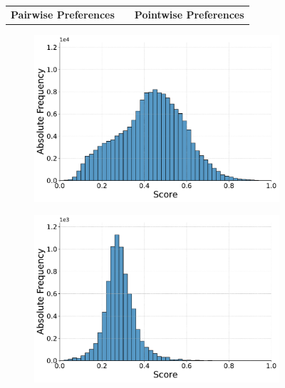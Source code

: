 \begin{figure}[t!]
    \centering
    \begin{tabular}{ccc}
        \textbf{Pairwise Preferences} & \hspace{2cm} & \textbf{Pointwise Preferences} \\
    \end{tabular}
    \footnotesize
    \begin{subfigure}[b]{0.49\textwidth}
        \centering
        \includegraphics[width=\textwidth]{graphics/seaborn/pairwise_cw22_score_distribution_flan-t5-base.pdf}
        \label{fig:pairwise_flan-t5-base}
    \end{subfigure}
    \hfill
    \begin{subfigure}[b]{0.49\textwidth}
        \centering
        \includegraphics[width=\textwidth]{graphics/seaborn/pointwise_cw22_score_distribution_flan-t5-base.pdf}
        \label{fig:pointwise_flan-t5-base}
    \end{subfigure}


\end{figure}

